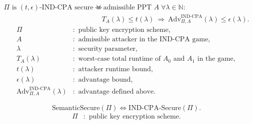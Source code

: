 \documentclass[12pt,a4paper]{article}
\begin{document}
\pagebreak[3]
\begin{samepage}
\begin{definition}
\[
\begin{aligned}
\Pi\text{ is }(t,\epsilon)\text{-IND-CPA secure}\iff
&\ \forall\text{ admissible PPT }A\;\forall\lambda\in\mathbb{N}:\\
&\quad T_A(\lambda)\leq t(\lambda)
\ \Longrightarrow\
\mathrm{Adv}^{\mathrm{IND\text{-}CPA}}_{\Pi,A}(\lambda)\leq\epsilon(\lambda).
\end{aligned}
\]
\[
\begin{aligned}
\Pi&:\text{ public key encryption scheme},\\
A&:\text{ admissible attacker in the IND-CPA game},\\
\lambda&:\text{ security parameter},\\
T_A(\lambda)&:\text{ worst-case total runtime of }A_0\text{ and }A_1
\text{ in the game},\\
t(\lambda)&:\text{ attacker runtime bound},\\
\epsilon(\lambda)&:\text{ advantage bound},\\
\mathrm{Adv}^{\mathrm{IND\text{-}CPA}}_{\Pi,A}(\lambda)&:\text{ advantage defined above}.
\end{aligned}
\]
\end{definition}
\end{samepage}

\begin{theorem}
\[
\mathrm{SemanticSecure}(\Pi)
\iff\mathrm{IND\text{-}CPA\text{-}Secure}(\Pi).
\]
\[
\begin{aligned}
\Pi&:\text{ public key encryption scheme}.
\end{aligned}
\]
\end{theorem}
\end{document}
